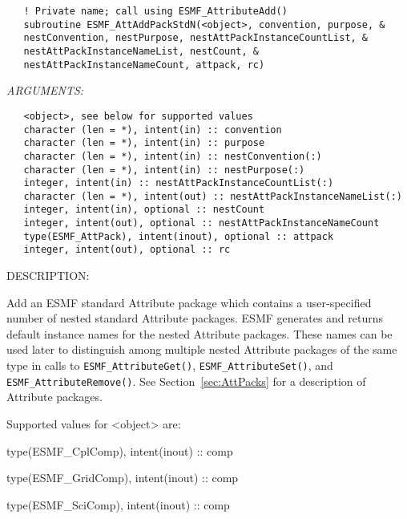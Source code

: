  
\begin{verbatim}   ! Private name; call using ESMF_AttributeAdd()
   subroutine ESMF_AttAddPackStdN(<object>, convention, purpose, &
   nestConvention, nestPurpose, nestAttPackInstanceCountList, &
   nestAttPackInstanceNameList, nestCount, &
   nestAttPackInstanceNameCount, attpack, rc)\end{verbatim}{\em ARGUMENTS:}
\begin{verbatim}   <object>, see below for supported values
   character (len = *), intent(in) :: convention
   character (len = *), intent(in) :: purpose
   character (len = *), intent(in) :: nestConvention(:)
   character (len = *), intent(in) :: nestPurpose(:)
   integer, intent(in) :: nestAttPackInstanceCountList(:)
   character (len = *), intent(out) :: nestAttPackInstanceNameList(:)
   integer, intent(in), optional :: nestCount
   integer, intent(out), optional :: nestAttPackInstanceNameCount
   type(ESMF_AttPack), intent(inout), optional :: attpack
   integer, intent(out), optional :: rc\end{verbatim}
{\sf DESCRIPTION:\\ }


   Add an ESMF standard Attribute package which contains a user-specified
   number of nested standard Attribute packages. ESMF generates and returns
   default instance names for the nested Attribute packages. These names
   can be used later to distinguish among multiple nested Attribute
   packages of the same type in calls to {\tt ESMF\_AttributeGet()},
   {\tt ESMF\_AttributeSet()}, and {\tt ESMF\_AttributeRemove()}.
   See Section~\ref{sec:AttPacks} for a description of Attribute packages.
  
   Supported values for <object> are:
   \begin{description}
   \item type(ESMF\_CplComp), intent(inout) :: comp
   \item type(ESMF\_GridComp), intent(inout) :: comp
   \item type(ESMF\_SciComp), intent(inout) :: comp
   \end{description}
  
